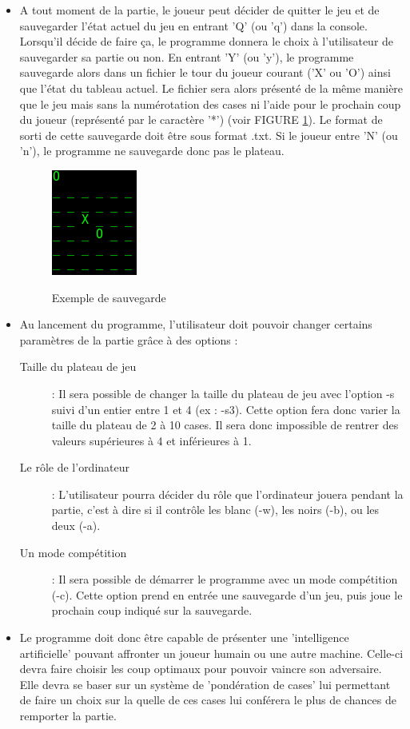 \documentclass[10pt, a4paper]{article}
\begin{document}
\begin {itemize}
\item A tout moment de la partie, le joueur peut décider de quitter le jeu et de sauvegarder l'état actuel du jeu en entrant 'Q' (ou 'q') dans la console. Lorsqu'il décide de faire ça, le programme donnera le choix à l'utilisateur de sauvegarder sa partie ou non. En entrant 'Y' (ou 'y'), le programme sauvegarde alors dans un fichier le tour du joueur courant ('X' ou 'O') ainsi que l'état du tableau actuel. Le fichier sera alors présenté de la même manière que le jeu mais sans la numérotation des cases ni l'aide pour le prochain coup du joueur (représenté par le caractère '*') (voir FIGURE \ref{exemple_save}). Le format de sorti de cette sauvegarde doit être sous format .txt. Si le joueur entre 'N' (ou 'n'), le programme ne sauvegarde donc pas le plateau. %
  \begin {figure}[H]
    \centering
    \includegraphics [scale = 0.5]{images/exemple_sauvegarde.png}
    \label {exemple_save}
    \caption {Exemple de sauvegarde}
  \end   {figure}
  
\item Au lancement du programme, l'utilisateur doit pouvoir changer certains paramètres de la partie grâce à des options :
  \begin {description}
  \item [Taille du plateau de jeu] : Il sera possible de changer la taille du plateau de jeu avec l'option -s suivi d'un entier entre 1 et 4 (ex : -s3). Cette option fera donc varier la taille du plateau de 2 à 10 cases. Il sera donc impossible de rentrer des valeurs supérieures à 4 et inférieures à 1.
  \item [Le rôle de l'ordinateur]  : L'utilisateur pourra décider du rôle que l'ordinateur jouera pendant la partie, c'est à dire si il contrôle les blanc (-w), les noirs (-b), ou les deux (-a).
  \item [Un mode compétition]      : Il sera possible de démarrer le programme avec un mode compétition (-c). Cette option prend en entrée une sauvegarde d'un jeu, puis joue le prochain coup indiqué sur la sauvegarde.
  \end   {description}

\item Le programme doit donc être capable de présenter une 'intelligence artificielle' pouvant affronter un joueur humain ou une autre machine. Celle-ci devra faire choisir les coup optimaux pour pouvoir vaincre son adversaire. Elle devra se baser sur un système de 'pondération de cases' lui permettant de faire un choix sur la quelle de ces cases lui conférera le plus de chances de remporter la partie.
\end   {itemize}
\end{document}
